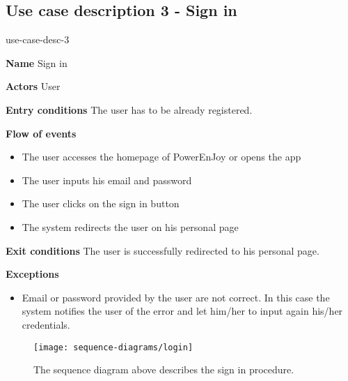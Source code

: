 \subsection{Use case description 3 - Sign in}
\begin{labeling}{use-case-desc-3}
	\item[\textbf{Name}] Sign in
	\item[\textbf{Actors}] User
	\item[\textbf{Entry conditions}] The user has to be already registered.
	\item[\textbf{Flow of events}]
		\begin{itemize}
			\item[]
			\item The user accesses the homepage of PowerEnJoy or opens the app
			\item The user inputs his email and password
			\item The user clicks on the sign in button
			\item The system redirects the user on his personal page
		\end{itemize}
	\item[\textbf{Exit conditions}] The user is successfully redirected to his personal page.
	\item[\textbf{Exceptions}]
		\begin{itemize}
			\item[]
			\item Email or password provided by the user are not correct. In this case the system notifies the user of the error and let him/her to input again his/her credentials. 
		\end{itemize}
\end{labeling}
\begin{figure}[H]
	\centering
	\texttt{[image: sequence-diagrams/login]}
	\caption[Sequence diagram - Sign in]{The sequence diagram above describes the sign in procedure.}
	\label{fig:login-sequence-diagram}
\end{figure}
\clearpage

